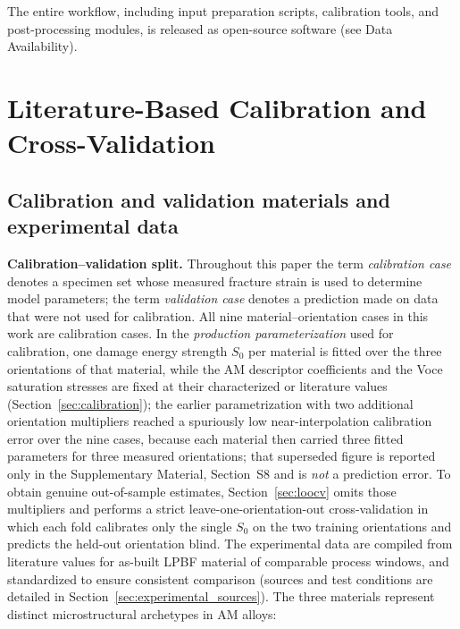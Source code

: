 The entire workflow, including input preparation scripts, calibration tools, and post-processing modules, is released as open-source software (see Data Availability).

\section{Literature-Based Calibration and Cross-Validation}
\label{sec:validation}

\subsection{Calibration and validation materials and experimental data}

\textbf{Calibration--validation split.} Throughout this paper the term \emph{calibration case} denotes a specimen set whose measured fracture strain is used to determine model parameters; the term \emph{validation case} denotes a prediction made on data that were not used for calibration. All nine material--orientation cases in this work are calibration cases. In the \emph{production parameterization} used for calibration, one damage energy strength $S_0$ per material is fitted over the three orientations of that material, while the AM descriptor coefficients and the Voce saturation stresses are fixed at their characterized or literature values (Section~\ref{sec:calibration}); the earlier parametrization with two additional orientation multipliers reached a spuriously low near-interpolation calibration error over the nine cases, because each material then carried three fitted parameters for three measured orientations; that superseded figure is reported only in the Supplementary Material, Section~S8 and is \emph{not} a prediction error. To obtain genuine out-of-sample estimates, Section~\ref{sec:loocv} omits those multipliers and performs a strict leave-one-orientation-out cross-validation in which each fold calibrates only the single $S_0$ on the two training orientations and predicts the held-out orientation blind. The experimental data are compiled from literature values for as-built LPBF material of comparable process windows, and standardized to ensure consistent comparison (sources and test conditions are detailed in Section~\ref{sec:experimental_sources}).
The three materials represent distinct microstructural archetypes in AM alloys:

